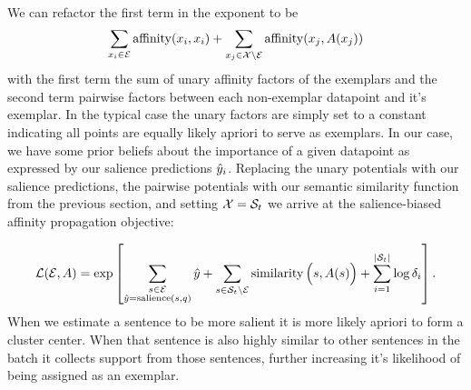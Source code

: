  We can refactor the first term in the exponent to be 
\[ \sum_{x_i \in \mathcal{E}} \operatorname{affinity}(x_i, x_i) +
 \sum_{x_j \in \mathcal{X} \setminus \mathcal{E}} \operatorname{affinity}(x_j, A(x_j))
 \]
with the first term the sum of unary affinity factors of the exemplars 
and the second term pairwise factors between each non-exemplar datapoint 
and it's exemplar. In the typical case the unary factors are simply 
set to a constant indicating all points are equally likely apriori to serve
as exemplars. In our case, we have some prior beliefs about the importance of 
a given datapoint as expressed by our salience predictions $\hat{y}_i$.
Replacing the unary potentials with our salience predictions, 
the pairwise potentials with our semantic similarity function from the 
previous section, and setting $\mathcal{X} = \mathcal{S}_t$ 
we arrive at the salience-biased affinity propagation
objective:

 \[ \mathcal{L}(\mathcal{E}, A) = \exp\left[
    \sum_{\substack{s \in \mathcal{E} \\ \hat{y} = \operatorname{salience}(s, q)}} \hat{y}  + \sum_{s \in \mathcal{S}_t \setminus \mathcal{E}} \operatorname{similarity}\Big(s, A(s)\Big)  + \sum_{i=1}^{|\mathcal{S}_t|} \log\delta_i \right].
\] 
When we estimate a sentence to be more salient it is more likely apriori
to form a cluster center. When that sentence is also highly similar to other 
sentences in the batch it collects support from those sentences, further
increasing it's likelihood of being assigned as an exemplar.
 



